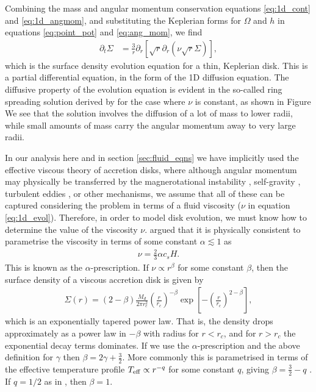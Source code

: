 Combining the mass and angular momentum conservation equations \ref{eq:1d_cont} and \ref{eq:1d_angmom}, and substituting the Keplerian forms for $\Omega$ and $h$ in equations \ref{eq:point_pot} and \ref{eq:ang_mom}, we find
\begin{align}
    \partial_t \Sigma &= \frac{3}{r} \partial_r \left[ \sqrt{r} \partial_r \left( \nu \sqrt{r} \Sigma  \right)  \right] \label{eq:1d_evol},
\end{align}
which is the surface density evolution equation for a thin, Keplerian disk. 
This is a partial differential equation, in the form of the 1D diffusion equation.
The diffusive property of the evolution equation is evident in the so-called ring spreading solution derived by \citet{lynden-bell1974} for the case where $\nu$ is constant, as shown in Figure %
We see that the solution involves the diffusion of a lot of mass to lower radii, while small amounts of mass carry the angular momentum away to very large radii.

In our analysis here and in section \ref{sec:fluid_eqns} we have implicitly used the effective viscous theory of accretion disks, where although angular momentum may physically be transferred by the magnerotational instability \citep{sano2000}, self-gravity \citep{kratter2016}, turbulent eddies \citep{klahr2003}, or other mechanisms, we assume that all of these can be captured considering the problem in terms of a fluid viscosity ($\nu$ in equation \ref{eq:1d_evol}).
Therefore, in order to model disk evolution, we must know how to determine the value of the viscosity $\nu$.
\citet{shakura1973} argued that it is physically consistent to parametrise the viscosity in terms of some constant $\alpha \lesssim 1$ as
\begin{align}
    \nu = \frac{2}{3} \alpha c_s H.
\end{align}
This is known as the $\alpha$-prescription. If $\nu \propto r^\beta$ for some constant $\beta$, then the surface density of a viscous accretion disk is given by \citep{lynden-bell1974}
\begin{align}
    \Sigma(r) = (2 - \beta) \frac{M_d}{2 \pi r_c^2} \left( \frac{r}{r_c} \right)^{-\beta} \exp{\left[ - \left(\frac{r}{r_c}\right)^{2-\beta} \right]},
\end{align}
which is an exponentially tapered power law. That is, the density drops approximately as a power law in $-\beta$ with radius for $r < r_c$, and for $r > r_c$ the exponential decay terms dominates. If we use the $\alpha$-prescription and the above definition for $\gamma$ then $\beta=2\gamma+\frac{3}{2}$. 
More commonly this is parametrised in terms of the effective temperature profile $T_{\rm eff} \propto r^{-q}$ for some constant $q$, giving $\beta = \frac{3}{2} - q$ \citep{hartmann1998}. 
If $q=1/2$ as in \citet{chiang1997}, then $\beta=1$.


